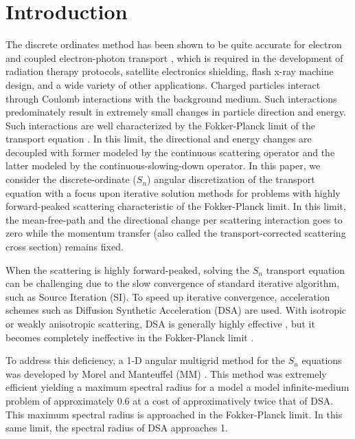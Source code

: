 \documentclass[preprint,10pt]{elsarticle}
\renewcommand{\(}{\left(}
\renewcommand{\)}{\right)}
\renewcommand{\[}{\left[}
\renewcommand{\]}{\right]}
\begin{document}
\linenumbers
\doublespacing

\section{Introduction}
The discrete ordinates method has been shown to be quite accurate for electron
and coupled electron-photon transport \cite{morel_81,accuracy_1,accuracy_2}, 
which is required in the
development of radiation therapy protocols, satellite electronics shielding,
flash x-ray machine design, and a wide variety of other applications. Charged
particles interact through Coulomb interactions with the background medium.
Such interactions predominately result in extremely small changes in particle
direction and energy. Such interactions are well characterized by the
Fokker-Planck limit of the transport equation \cite{fp_limit,morel_96}. In this limit,
the directional and energy changes are decoupled with former modeled by the
continuous scattering operator and the latter modeled by the
continuous-slowing-down operator. In this paper, we consider the
discrete-ordinate ($S_n$) angular discretization of the transport equation
with a focus upon iterative solution methods for problems with highly
forward-peaked scattering characteristic of the Fokker-Planck limit. In this
limit, the mean-free-path and the directional change per scattering
interaction goes to zero while the momentum transfer (also called the
transport-corrected scattering cross section) remains fixed.

When the scattering is highly forward-peaked, solving the $S_n$ transport
equation can be challenging due to the slow convergence of standard iterative
algorithm, such as Source Iteration (SI). To speed up iterative convergence,
acceleration schemes such as Diffusion Synthetic Acceleration (DSA) are used.
With isotropic or weakly anisotropic scattering, DSA is generally highly
effective \cite{adams}, but it becomes completely ineffective in the
Fokker-Planck limit \cite{multigrid_1d}.

To address this deficiency, a 1-D angular multigrid method for the $S_n$
equations was developed by Morel and Manteuffel (MM) \cite{multigrid_1d}. This
method was extremely efficient yielding a maximum spectral radius for a model
a model infinite-medium problem of approximately 0.6 at a cost of
approximatively twice that of DSA. This maximum spectral radius is approached
in the Fokker-Planck limit. In this same limit, the spectral radius of DSA
approaches 1.
\end{document}
